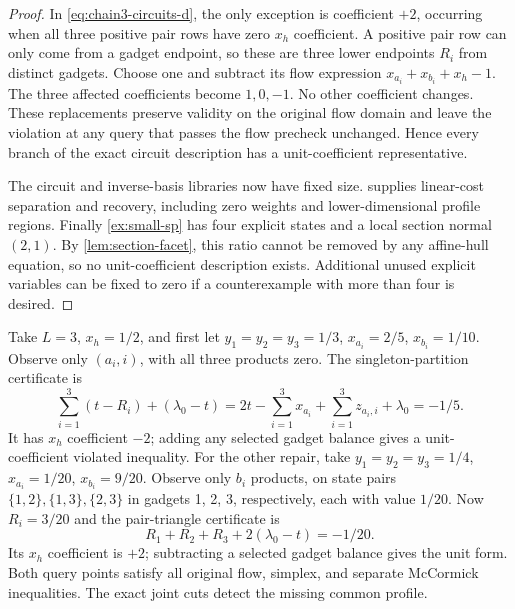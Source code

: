 \begin{proof}
In \eqref{eq:chain3-circuits-d}, the only exception is coefficient
$+2$, occurring when all three positive pair rows have zero
$x_h$ coefficient. A positive pair row can only come from a
gadget endpoint, so these are three lower endpoints $R_i$ from
distinct gadgets. Choose one and subtract its flow expression
$x_{a_i}+x_{b_i}+x_h-1$. The three affected coefficients become
$1,0,-1$. No other coefficient changes. These replacements preserve
validity on the original flow domain and leave the violation at any
query that passes the flow precheck unchanged. Hence every branch
of the exact circuit description has a unit-coefficient representative.

The circuit and inverse-basis libraries now have fixed size.
 supplies linear-cost separation and recovery,
including zero weights and lower-dimensional profile regions.
Finally \cref{ex:small-sp} has four explicit states and a local
section normal $(2,1)$. By \cref{lem:section-facet}, this ratio
cannot be removed by any affine-hull equation, so no unit-coefficient
description exists. Additional unused explicit variables can be
fixed to zero if a counterexample with more than four is desired.
\end{proof}

\begin{example}\label{ex:chain3-repairs}
Take $L=3$, $x_h=1/2$, and first let $y_1=y_2=y_3=1/3$,
$x_{a_i}=2/5$, $x_{b_i}=1/10$. Observe only $(a_i,i)$,
with all three products zero. The singleton-partition certificate is
\[
 \sum_{i=1}^3(t-R_i)+(\lambda_0-t)
   =2t-\sum_{i=1}^3x_{a_i}+\sum_{i=1}^3z_{a_i,i}+\lambda_0
   =-1/5.
\]
It has $x_h$ coefficient $-2$; adding any selected gadget balance
gives a unit-coefficient violated inequality.
For the other repair, take $y_1=y_2=y_3=1/4$,
$x_{a_i}=1/20$, $x_{b_i}=9/20$. Observe only $b_i$ products,
on state pairs $\{1,2\},\{1,3\},\{2,3\}$ in gadgets 1, 2, 3,
respectively, each with value $1/20$. Now $R_i=3/20$ and the
pair-triangle certificate is
\[
 R_1+R_2+R_3+2(\lambda_0-t)=-1/20.
\]
Its $x_h$ coefficient is $+2$; subtracting a selected gadget
balance gives the unit form. Both query points satisfy all original
flow, simplex, and separate McCormick inequalities. The exact
joint cuts detect the missing common profile.
\end{example}

